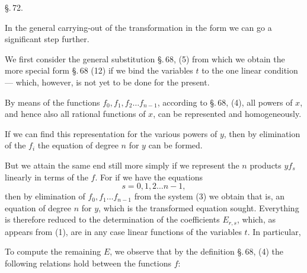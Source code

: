 
\begin{center}
\S.\,72.
\end{center}

\begin{center}
\end{center}

In the general carrying-out of the  transformation in the  form we can go a significant step further.

We first consider the general substitution \S.\,68, (5)
from which we obtain the more special form \S.\,68 (12) if we bind the variables $t$ to the one linear condition
— which, however, is not yet to be done for the present.

By means of the functions $f_0, f_1, f_2 \ldots f_{n-1}$, according to \S.\,68, (4), all powers of $x$, and hence also all rational functions of $x$, can be represented  and homogeneously.

If we can find this representation for the various powers of $y$, then by elimination of the $f_i$ the equation of degree $n$ for $y$ can be formed.

But we attain the same end still more simply if we represent the $n$ products $y f_s$ linearly in terms of the $f$. For if we have the equations
\[
s = 0, 1, 2 \ldots n-1,
\]
then by elimination of $f_0, f_1 \ldots f_{n-1}$ from the system (3) we obtain
that is, an equation of degree $n$ for $y$, which is the transformed equation sought. Everything is therefore reduced to the determination of the coefficients $E_{r,s}$, which, as appears from (1), are in any case linear functions of the variables $t$. In particular,

To compute the remaining $E$, we observe that by the definition \S.\,68, (4) the following relations hold between the functions $f$:
